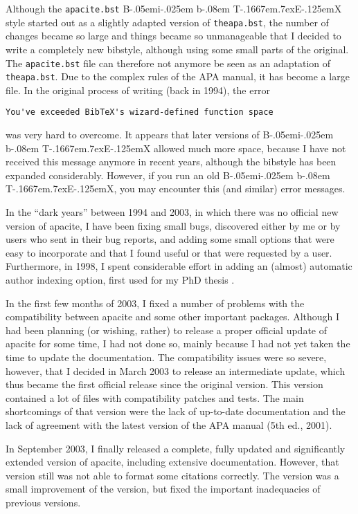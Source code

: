 \documentclass{article}
\def\BibTeX{{\rm B\kern-.05em{\sc i\kern-.025em b}\kern-.08em
    T\kern-.1667em\lower.7ex\hbox{E}\kern-.125emX}}%
\newcommand{\APACversiondate}[1]{\relax [#1]}
\newcommand{\pkg}[1]{\textsf{#1}}%
\newcommand{\fname}[1]{\texttt{#1}}%
\begin{document}
Although the \fname{apacite.bst} \BibTeX{} style started out as a slightly
adapted version of \fname{theapa.bst}, the number of changes became so large
and things became so unmanageable that I decided to write a completely new
bibstyle, although using some small parts of the original. The
\fname{apacite.bst} file can therefore not anymore be seen as an adaptation of
\fname{theapa.bst}. Due to the complex rules of the APA manual, it has become
a large file. In the original process of writing (back in 1994), the error
\begin{verbatim}
You've exceeded BibTeX's wizard-defined function space
\end{verbatim}
was very hard to overcome. It appears that later versions of \BibTeX{} allowed
much more space, because I have not received this message anymore in recent
years, although the bibstyle has been expanded considerably. However, if you
run an old \BibTeX{}, you may encounter this (and similar) error messages.

In the ``dark years'' between 1994 and 2003, in which there was no official
new version of \pkg{apacite}, I have been fixing small bugs, discovered either
by me or by users who sent in their bug reports, and adding some small options
that were easy to incorporate and that I found useful or that were requested
by a user. Furthermore, in 1998, I spent considerable effort in adding an
(almost) automatic author indexing option, first used for my PhD thesis
\cite{meijer1998}.

In the first few months of 2003, I fixed a number of problems with the
compatibility between \pkg{apacite} and some other important packages.
Although I had been planning (or wishing, rather) to release a proper official
update of \pkg{apacite} for some time, I had not done so, mainly because I had
not yet taken the time to update the documentation. The compatibility issues
were so severe, however, that I decided in March 2003 to release an
intermediate update, which thus became the first official release since the
original version. This version contained a lot of files with compatibility
patches and tests. The main shortcomings of that version were the lack of
up-to-date documentation and the lack of agreement with the latest version of
the APA manual (5th ed., 2001).

In September 2003, I finally released a complete, fully updated and
significantly extended version of \pkg{apacite}, including extensive
documentation. However, that version still was not able to format some
citations correctly. The \APACversiondate{2004/07/01} version was a small
improvement of the \APACversiondate{2003/09/05} version, but fixed the
important inadequacies of previous versions.
\end{document}
